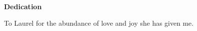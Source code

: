 
\newpage
\vspace*{0.9cm}
\begin{center}
{\bf \Huge Dedication}
\end{center}

\setlength{\baselineskip}{0.8cm}



To Laurel for the abundance of love and joy she has given me. 
